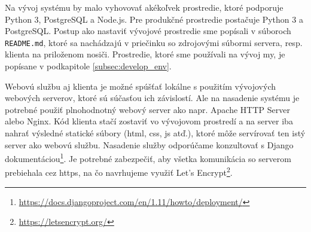 Na vývoj systému by malo vyhovovať akékoľvek prostredie, ktoré podporuje Python
3, PostgreSQL a Node.js. Pre produkčné prostredie postačuje Python 3 a
PostgreSQL. Postup ako nastaviť vývojové prostredie sme popísali v súboroch
\texttt{README.md}, ktoré sa nachádzajú v priečinku so zdrojovými súbormi
servera, resp. klienta na priloženom nosiči. Prostredie, ktoré sme používali na
vývoj my, je popísane v podkapitole \ref{subsec:develop_env}.

Webovú službu aj klienta je možné spúšťať lokálne s použitím vývojových webových
serverov, ktoré sú súčasťou ich závislostí. Ale na nasadenie systému je potrebné
použiť plnohodnotný webový server ako napr. Apache HTTP Server alebo Nginx. Kód
klienta stačí zostaviť vo vývojovom prostredí a na server iba nahrať výsledné
statické súbory (\acrshort{html}, \acrshort{css}, \acrshort{js} atď.), ktoré
môže servírovať ten istý server ako webovú službu. Nasadenie služby odporúčame
konzultovať s Django
dokumentáciou\footnote{\url{https://docs.djangoproject.com/en/1.11/howto/deployment/}}.
Je potrebné zabezpečiť, aby všetka komunikácia so serverom prebiehala cez
\acrshort{https}, na čo navrhujeme využiť Let's
Encrypt\footnote{\url{https://letsencrypt.org/}}.
